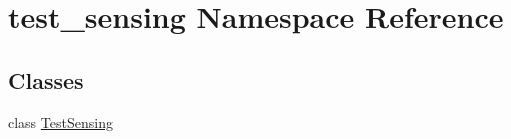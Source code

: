 \hypertarget{namespacetest__sensing}{\section{test\-\_\-sensing Namespace Reference}
\label{namespacetest__sensing}
}
\subsection*{Classes}
\begin{DoxyCompactItemize}
\item 
class \hyperlink{classtest__sensing_1_1_test_sensing}{Test\-Sensing}
\end{DoxyCompactItemize}
